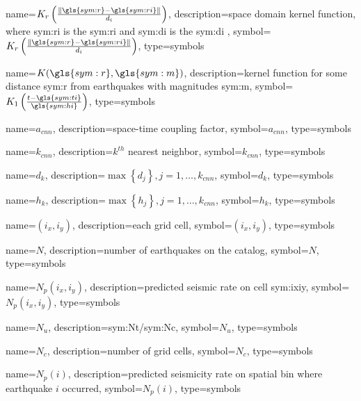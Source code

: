 {
	name={\ensuremath{K_r \left( \frac{ \| \gls{sym:r} - \gls{sym:ri} \| }{d_i} \right) }},
	description={space domain kernel function, where
					\gls{sym:ri} is the \glsdesc{sym:ri} and
					\gls{sym:di} is the \glsdesc{sym:di}
	},
	symbol={\ensuremath{K_r \left( \frac{ \| \gls{sym:r} - \gls{sym:ri} \| }{d_i} \right)}},
	type=symbols
}


{
	name={\ensuremath{K(\gls{sym:r},\gls{sym:m})}},
	description={kernel function for some distance \gls{sym:r} from earthquakes with magnitudes  \gls{sym:m}},
	symbol={\ensuremath{K_1 \left( \frac{ t - \gls{sym:ti} }{ \gls{sym:hi} } \right)}},
	type=symbols
}

{
	name={\ensuremath{a_{cnn}}},
	description={space-time coupling factor},
	symbol={\ensuremath{a_{cnn}}},
	type=symbols
}

{
	name={\ensuremath{k_{cnn}}},
	description={$k^{th}$ nearest neighbor},
	symbol={\ensuremath{k_{cnn}}},
	type=symbols
}


{
	name={\ensuremath{d_k}},
	description={$\max{\left\{ d_j \right\}}, j=1,\ldots,k_{cnn}$},
	symbol={\ensuremath{d_k}},
	type=symbols
}

{
	name={\ensuremath{h_k}},
	description={$\max{\left\{ h_j \right\} }, j=1,\ldots,k_{cnn}$},
	symbol={\ensuremath{h_k}},
	type=symbols
}

{
	name={\ensuremath{\left(i_x, i_y\right)}},
	description={each grid cell},
	symbol={\ensuremath{\left(i_x, i_y\right)}},
	type=symbols
}


{
	name={\ensuremath{N}},
	description={number of earthquakes on the catalog},
	symbol={\ensuremath{N}},
	type=symbols
}



{
	name={\ensuremath{N_p\left(i_x, i_y\right)}},
	description={predicted seismic rate on cell \gls{sym:ixiy}},
	symbol={\ensuremath{N_p\left(i_x, i_y\right)}},
	type=symbols
}


{
	name={\ensuremath{N_u}},
	description={\gls{sym:Nt}/\gls{sym:Nc}},
	symbol={\ensuremath{N_u}},
	type=symbols
}


{
	name={\ensuremath{N_c}},
	description={number of grid cells},
	symbol={\ensuremath{N_c}},
	type=symbols
}


{
	name={\ensuremath{N_p(i)}},
	description={predicted seismicity rate on spatial bin where earthquake
	$i$ occurred}, symbol={\ensuremath{N_p(i)}},
	type=symbols
}


